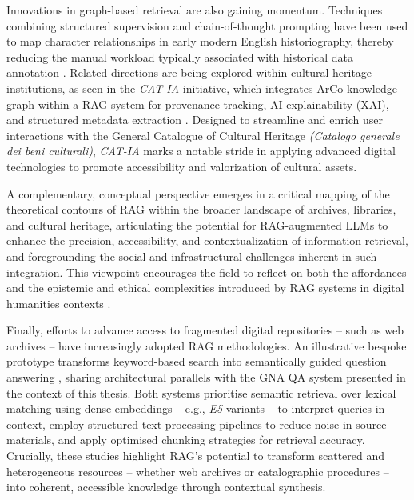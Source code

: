 \begin{spacing}{1.5}
Innovations in graph-based retrieval are also gaining momentum. Techniques combining structured supervision and chain-of-thought prompting have been used to map character relationships in early modern English historiography, thereby reducing the manual workload typically associated with historical data annotation \citep{fan_research_2025}. Related directions are being explored within cultural heritage institutions, as seen in the \textit{CAT-IA} initiative, which integrates ArCo knowledge graph \citep{carriero_arco_2019} within a RAG system for provenance tracking, AI explainability (XAI), and structured metadata extraction \citep{barbato_nasce_2025}. Designed to streamline and enrich user interactions with the General Catalogue of Cultural Heritage \textit{(Catalogo generale dei beni culturali)}, \textit{CAT-IA} marks a notable stride in applying advanced digital technologies to promote accessibility and valorization of cultural assets.

A complementary, conceptual perspective emerges in a critical mapping of the theoretical contours of RAG within the broader landscape of archives, libraries, and cultural heritage, articulating the potential for RAG-augmented LLMs to enhance the precision, accessibility, and contextualization of information retrieval, and foregrounding the social and infrastructural challenges inherent in such integration. This viewpoint encourages the field to reflect on both the affordances and the epistemic and ethical complexities introduced by RAG systems in digital humanities contexts \citep{di_marcantonio_intelligenza_2024}.


Finally, efforts to advance access to fragmented digital repositories -- such as web archives -- have increasingly adopted RAG methodologies. An illustrative bespoke prototype transforms keyword-based search into semantically guided question answering \citep{davis_unlocking_2025}, sharing architectural parallels with the GNA QA system presented in the context of this thesis. Both systems prioritise semantic retrieval over lexical matching using dense embeddings -- e.g., \textit{E5} variants \citep{wang_text_2024} -- to interpret queries in context, employ structured text processing pipelines to reduce noise in source materials, and apply optimised chunking strategies for retrieval accuracy. Crucially, these studies highlight RAG’s potential to transform scattered and heterogeneous resources -- whether web archives or catalographic procedures -- into coherent, accessible knowledge through contextual synthesis.


\end{spacing}
